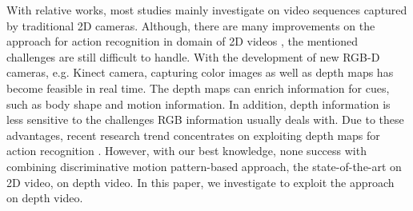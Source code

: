 \documentclass[final,3p,times,twocolumn]{elsarticle}
\begin{document}
With relative works, most studies mainly investigate on video sequences captured by traditional 2D cameras.
Although, there are many improvements on the approach for action recognition in domain of 2D videos \cite{jain2013better, wang2013action}, the mentioned challenges are still difficult to handle.
With the development of new RGB-D cameras, e.g. Kinect camera, capturing color images as well as depth maps has become feasible in real time.
The depth maps can enrich information for cues, such as body shape and motion information.
In addition, depth information is less sensitive to the challenges RGB information usually deals with.
Due to these advantages, recent research trend concentrates on exploiting depth maps for action recognition \cite{li2010action, wang2012mining, vieira2012stop, yang2012eigenjoints, yang2012recognizing, wang2012robust, xia2013spatio, oreifej2013hon4d, luo2013group}.
However, with our best knowledge, none success with combining discriminative motion pattern-based approach, the state-of-the-art on 2D video, on depth video.
In this paper, we investigate to exploit the approach on depth video.
\end{document}
